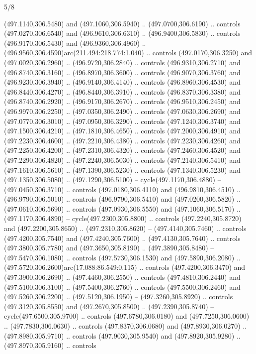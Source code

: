 \begin{flagdescription}{5/8}
\begin{scope}[xshift=0.5\flaglength,yshift=0.5\flagwidth,scale=\flagwidth/475.63]
\begin{scope}[y=0.8pt, x=0.8pt, yscale=-1, xscale=1,shift={(-450,-300)}]
\begin{scope}[cm={{1.0,0.0,0.0,1.0,(-0.0002,0.12556)}},cm={{1.0,0.0,0.0,1.0,(0.00179,0.0)}}]
\begin{scope}[cm={{1.11592,0.0,0.0,1.11592,(-106.89933,-41.77764)}}]
\begin{scope}[draw=black,fill=cfff]
\begin{scope}[fill=black]
  (497.1140,306.5480) and (497.1060,306.5940) .. (497.0700,306.6190) .. controls
  (497.0270,306.6540) and (496.9610,306.6310) .. (496.9400,306.5830) .. controls
  (496.9170,306.5430) and (496.9360,306.4960) ..
  (496.9560,306.4590)arc(211.494:218.774:1.040) .. controls (497.0170,306.3250)
  and (497.0020,306.2960) .. (496.9720,306.2840) .. controls (496.9310,306.2710)
  and (496.8740,306.3160) .. (496.8970,306.3600) .. controls (496.9070,306.3760)
  and (496.9230,306.3940) .. (496.9140,306.4140) .. controls (496.8960,306.4530)
  and (496.8440,306.4270) .. (496.8440,306.3910) .. controls (496.8370,306.3380)
  and (496.8740,306.2920) .. (496.9170,306.2670) .. controls (496.9510,306.2450)
  and (496.9970,306.2250) .. (497.0350,306.2490) .. controls (497.0630,306.2690)
  and (497.0770,306.3010) .. (497.0950,306.3290) .. controls (497.1240,306.3740)
  and (497.1500,306.4210) .. (497.1810,306.4650) .. controls (497.2000,306.4910)
  and (497.2230,306.4600) .. (497.2210,306.4380) .. controls (497.2230,306.4260)
  and (497.2250,306.4200) .. (497.2310,306.4320) .. controls (497.2460,306.4520)
  and (497.2290,306.4820) .. (497.2240,306.5030) .. controls (497.2140,306.5410)
  and (497.1610,306.5610) .. (497.1390,306.5230) .. controls (497.1340,306.5230)
  and (497.1350,306.5080) .. (497.1290,306.5100) -- cycle(497.1170,306.4880) --
  (497.0450,306.3710) .. controls (497.0180,306.4110) and (496.9810,306.4510) ..
  (496.9790,306.5010) .. controls (496.9790,306.5410) and (497.0200,306.5820) ..
  (497.0610,306.5690) .. controls (497.0930,306.5550) and (497.1060,306.5170) ..
  (497.1170,306.4890) -- cycle(497.2300,305.8800) .. controls
  (497.2240,305.8720) and (497.2200,305.8650) .. (497.2310,305.8620) --
  (497.4140,305.7460) .. controls (497.4200,305.7540) and (497.4240,305.7600) ..
  (497.4130,305.7640) .. controls (497.3800,305.7780) and (497.3650,305.8190) ..
  (497.3890,305.8480) -- (497.5470,306.1080) .. controls (497.5730,306.1530) and
  (497.5890,306.2080) .. (497.5720,306.2600)arc(17.088:86.549:0.115) .. controls
  (497.4200,306.3470) and (497.3900,306.2690) .. (497.4460,306.2550) .. controls
  (497.4810,306.2440) and (497.5100,306.3100) .. (497.5400,306.2760) .. controls
  (497.5500,306.2460) and (497.5260,306.2200) .. (497.5120,306.1950) --
  (497.3260,305.8920) .. controls (497.3120,305.8550) and (497.2670,305.8500) ..
  (497.2390,305.8740) -- cycle(497.6500,305.9700) .. controls
  (497.6780,306.0180) and (497.7250,306.0600) .. (497.7830,306.0630) .. controls
  (497.8370,306.0680) and (497.8930,306.0270) .. (497.8980,305.9710) .. controls
  (497.9030,305.9540) and (497.8920,305.9280) .. (497.8970,305.9160) .. controls

\end{scope}
\end{scope}
\end{scope}
\end{scope}
\end{scope}
\end{scope}
\end{flagdescription}
